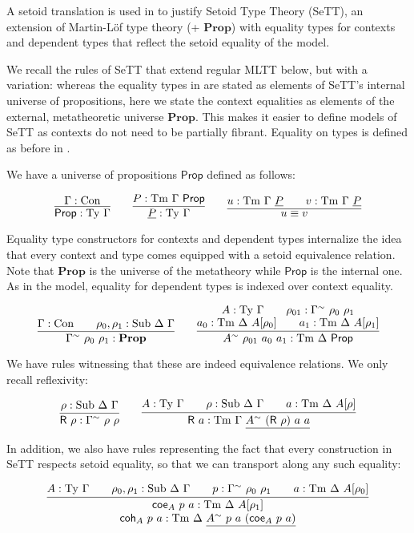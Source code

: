 \documentclass{easychair}
\newcommand{\GG}{\Gamma}
\newcommand{\DD}{\Delta}
\newcommand{\GD}{\Delta}
\newcommand{\coe}{\textsf{coe}}
\newcommand{\coh}{\textsf{coh}}
\newcommand{\tyj}[2]{#2 : \Ty\ #1}
\newcommand{\tmj}[3]{#2 : \Tm\ #1\ #3}
\newcommand{\subj}[3]{#1 : \mathrm{Sub}\ #2\ #3}
\newcommand{\Prop}{\textsf{Prop}}
\newcommand{\mProp}{\mathbf{Prop}}
\newcommand{\Con}{\mathrm{Con}}
\newcommand{\Ty}{\mathrm{Ty}}
\newcommand{\Tm}{\mathrm{Tm}}
\newcommand{\Sub}{\mathrm{Sub}}
\begin{document}
A setoid translation is used in \cite{mpc19} to justify Setoid Type Theory
(SeTT), an extension of Martin-L\"of type theory (+ $\mProp$) with equality
types for contexts and dependent types that reflect the setoid equality of the
model.

We recall the rules of SeTT that extend regular MLTT below, but with a
variation: whereas the equality types in \cite{mpc19} are stated as elements of
SeTT's internal universe of propositions, here we state the context equalities
as elements of the external, metatheoretic universe $\mProp$. This makes it easier
to define models of SeTT as contexts do not need to be partially fibrant. Equality on
types is defined as before in \cite{mpc19}.

We have a universe of propositions $\Prop$ defined as follows:

\[
\infer{
  \Prop : \Ty\ \GG
}{
  \GG : \Con
}
\qquad
\infer{
  \underline{P} : \Ty\ \GG
}{
  P : \Tm\ \GG\ \Prop
}
\qquad
\infer{
  u \equiv v
}{
  u : \Tm\ \GG\ \underline{P} && v : \Tm\ \GG\ \underline{P}
}
\]

Equality type constructors for contexts and dependent types internalize the idea
that every context and type comes equipped with a setoid equivalence
relation. Note that $\mProp$ is the universe of the metatheory while $\Prop$ is
the internal one. As in the model, equality for dependent types is indexed over context
equality.

\[
\infer{
  \GG^\sim\ \rho_0\ \rho_1 : \mProp
}{
  \GG : \Con \qquad \subj{\rho_0, \rho_1}{\DD}{\GG}
}
\qquad
\infer{
  A^{\sim}\ \rho_{01}\ a_0\ a_1 : \Tm\ \DD\ \Prop
}{
  \deduce{
    a_0 : \Tm\ \DD\ A[\rho_0] \qquad a_1 : \Tm\ \DD\ A[\rho_1]
  }{
    A : \Ty\ \GG \qquad \rho_{01} : \GG^{\sim}\ \rho_0\ \rho_1
  }
}
\]

We have rules witnessing that these are indeed equivalence relations. We only
recall reflexivity:

\[
\infer{
  \textsf{R}\ \rho : \GG^\sim\ \rho\ \rho
}{
  \rho : \Sub\ \GD\ \GG
}
\qquad
\infer{
  \textsf{R}\ a : \Tm\ \GG\ \underline{A^\sim\ (\textsf{R}\ \rho)\ a\ a}
}{
  A : \Ty\ \GG
  \qquad
  \rho : \Sub\ \GD\ \GG
  \qquad
  a : \Tm\ \GD\ A[\rho]
}
\]

In addition, we also have rules representing the fact that every construction in
SeTT respects setoid equality, so that we can transport along any such equality:

    \[
    \infer{
      \deduce{
        \tmj{\GD}{\coh_A\ p\ a}{\underline{A^\sim\ p\ a\ (\coe_A\ p\ a)}}
      }{
        \tmj{\GD}{\coe_A\ p\ a}{A[\rho_1]}
      }
    }{
      \tyj{\GG}{A} \qquad \subj{\rho_0, \rho_1}{\GD}{\GG} \qquad
      p : \GG^\sim\ \rho_0\ \rho_1\qquad
      \tmj{\GD}{a}{A[\rho_0]}
    }
    \]
\end{document}
